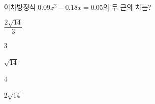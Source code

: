 이차방정식 $0.09x^2-0.18x=0.05$의 두 근의 차는?
\begin{choices32}{\rule[-3ex]{0pt}{8ex}$\dfrac{2\sqrt{14}}{3}$}{\rule[-3ex]{0pt}{8ex}$3$}{\rule[-3ex]{0pt}{8ex}$\sqrt{14}$}{\rule[-3ex]{0pt}{8ex}$4$}{\rule[-3ex]{0pt}{8ex}$2\sqrt{14}$}\end{choices32}
